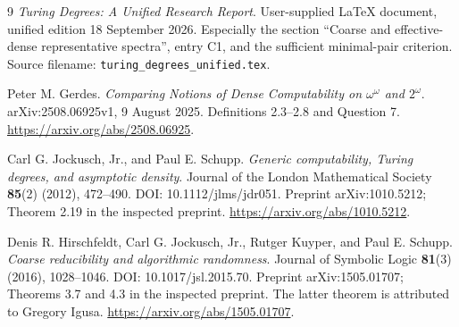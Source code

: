 \documentclass[11pt,a4paper]{article}
\theoremstyle{definition}\newtheorem{definition}[theorem]{Definition}
\theoremstyle{remark}\newtheorem{remark}[theorem]{Remark}
\begin{document}
\begin{thebibliography}{9}
\emph{Turing Degrees: A Unified Research Report}.
User-supplied LaTeX document, unified edition 18 September 2026.
Especially the section ``Coarse and effective-dense representative spectra'',
entry C1, and the sufficient minimal-pair criterion.
Source filename: \texttt{turing\_degrees\_unified.tex}.

Peter M. Gerdes.
\emph{Comparing Notions of Dense Computability on $\omega^\omega$ and $2^\omega$}.
arXiv:2508.06925v1, 9 August 2025.
Definitions 2.3--2.8 and Question 7.
\url{https://arxiv.org/abs/2508.06925}.

Carl G. Jockusch, Jr., and Paul E. Schupp.
\emph{Generic computability, Turing degrees, and asymptotic density}.
Journal of the London Mathematical Society \textbf{85}(2) (2012), 472--490.
DOI: 10.1112/jlms/jdr051.
Preprint arXiv:1010.5212; Theorem 2.19 in the inspected preprint.
\url{https://arxiv.org/abs/1010.5212}.

Denis R. Hirschfeldt, Carl G. Jockusch, Jr., Rutger Kuyper, and Paul E. Schupp.
\emph{Coarse reducibility and algorithmic randomness}.
Journal of Symbolic Logic \textbf{81}(3) (2016), 1028--1046.
DOI: 10.1017/jsl.2015.70.
Preprint arXiv:1505.01707; Theorems 3.7 and 4.3 in the inspected preprint.
The latter theorem is attributed to Gregory Igusa.
\url{https://arxiv.org/abs/1505.01707}.
\end{thebibliography}
\end{document}
